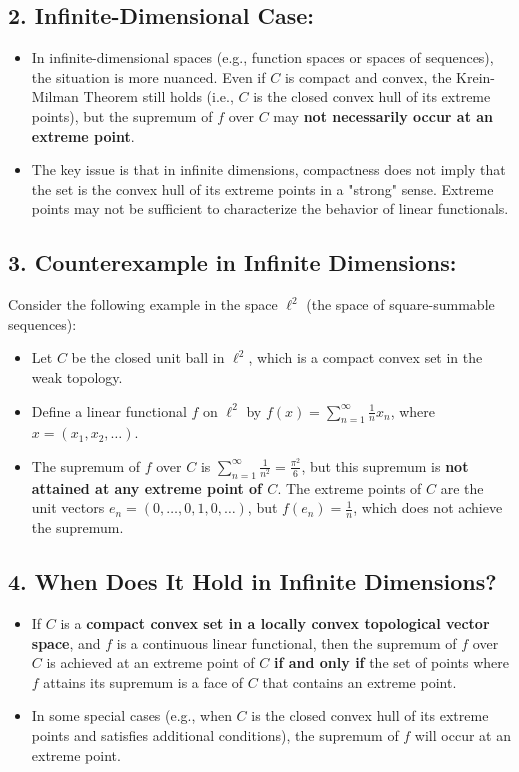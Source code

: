 \documentclass{article}
\begin{document}
\subsection*{2. Infinite-Dimensional Case:}
\begin{itemize}
    \item In infinite-dimensional spaces (e.g., function spaces or spaces of sequences), the situation is more nuanced. Even if \( C \) is compact and convex, the Krein-Milman Theorem still holds (i.e., \( C \) is the closed convex hull of its extreme points), but the supremum of \( f \) over \( C \) may \textbf{not necessarily occur at an extreme point}.
    \item The key issue is that in infinite dimensions, compactness does not imply that the set is the convex hull of its extreme points in a "strong" sense. Extreme points may not be sufficient to characterize the behavior of linear functionals.
\end{itemize}

\subsection*{3. Counterexample in Infinite Dimensions:}
Consider the following example in the space \( \ell^2 \) (the space of square-summable sequences):
\begin{itemize}
    \item Let \( C \) be the closed unit ball in \( \ell^2 \), which is a compact convex set in the weak topology.
    \item Define a linear functional \( f \) on \( \ell^2 \) by \( f(x) = \sum_{n=1}^\infty \frac{1}{n} x_n \), where \( x = (x_1, x_2, \dots) \).
    \item The supremum of \( f \) over \( C \) is \( \sum_{n=1}^\infty \frac{1}{n^2} = \frac{\pi^2}{6} \), but this supremum is \textbf{not attained at any extreme point of \( C \)}. The extreme points of \( C \) are the unit vectors \( e_n = (0, \dots, 0, 1, 0, \dots) \), but \( f(e_n) = \frac{1}{n} \), which does not achieve the supremum.
\end{itemize}

\subsection*{4. When Does It Hold in Infinite Dimensions?}
\begin{itemize}
    \item If \( C \) is a \textbf{compact convex set in a locally convex topological vector space}, and \( f \) is a continuous linear functional, then the supremum of \( f \) over \( C \) is achieved at an extreme point of \( C \) \textbf{if and only if} the set of points where \( f \) attains its supremum is a face of \( C \) that contains an extreme point.
    \item In some special cases (e.g., when \( C \) is the closed convex hull of its extreme points and satisfies additional conditions), the supremum of \( f \) will occur at an extreme point.
\end{itemize}
\end{document}
